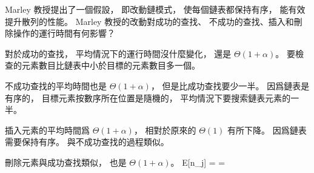 \startEXERCISE
Marley 教授提出了一個假設，
即改動鏈模式，
使每個鏈表都保持有序，
能有效提升散列的性能。
 Marley 教授的改動對成功的查找、
不成功的查找、插入和刪除操作的運行時間有何影響？
\stopEXERCISE

\startANSWER
對於成功的查找，
平均情況下的運行時間沒什麼變化，
還是 $\Theta(1+\alpha)$。
要檢查的元素數目比鏈表中小於目標的元素數目多一個。

不成功查找的平均時間也是 $\Theta(1+\alpha)$，
但是比成功查找要少一半。
因爲鏈表是有序的，
目標元素按數序所在位置是隨機的，
平均情況下要搜索鏈表元素的一半。

插入元素的平均時間爲 $\Theta(1+\alpha)$，
相對於原來的 $\Theta(1)$ 有所下降。
因爲鏈表需要保持有序。
與不成功查找的過程類似。

刪除元素與成功查找類似，
也是 $\Theta(1+\alpha)$。
\startformula
E[n_j] = \alpha = 
\stopformula
\stopANSWER
